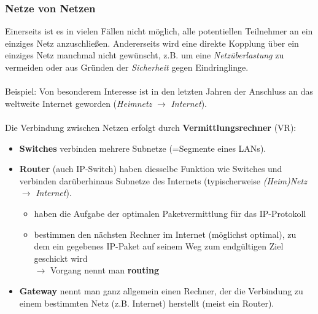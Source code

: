 \subsubsection{Netze von Netzen}
Einerseits ist es in vielen Fällen nicht möglich, alle potentiellen Teilnehmer an ein einziges Netz
anzuschließen. Andererseits wird eine direkte Kopplung über ein einziges Netz manchmal nicht gewünscht,
z.B. um eine \textit{Netzüberlastung} zu vermeiden oder aus Gründen der \textit{Sicherheit} gegen Eindringlinge.\\~\\
Beispiel: Von besonderem Interesse ist in den letzten Jahren der Anschluss an das weltweite Internet geworden (\textit{Heimnetz} $\to$ \textit{Internet}).\\~\\
Die Verbindung zwischen Netzen erfolgt durch \textbf{Vermittlungsrechner} (VR):
\begin{itemize}
	\item \textbf{Switches} verbinden mehrere Subnetze (=Segmente eines LANs).
	\item \textbf{Router} (auch IP-Switch) haben diesselbe Funktion wie Switches und verbinden darüberhinaus Subnetze des Internets (typischerweise \textit{(Heim)Netz} $\to$ \textit{Internet}).
	\begin{itemize}
		\item haben die Aufgabe der optimalen Paketvermittlung für das IP-Protokoll
		\item bestimmen den nächsten Rechner im Internet (möglichst optimal), zu dem ein gegebenes IP-Paket auf seinem Weg zum endgültigen Ziel geschickt wird\\
		$\to$ Vorgang nennt man \textbf{routing}
	\end{itemize}
	\item \textbf{Gateway} nennt man ganz allgemein einen Rechner, der die Verbindung zu einem bestimmten Netz (z.B. Internet) herstellt (meist ein Router).
\end{itemize}
%
%
%

